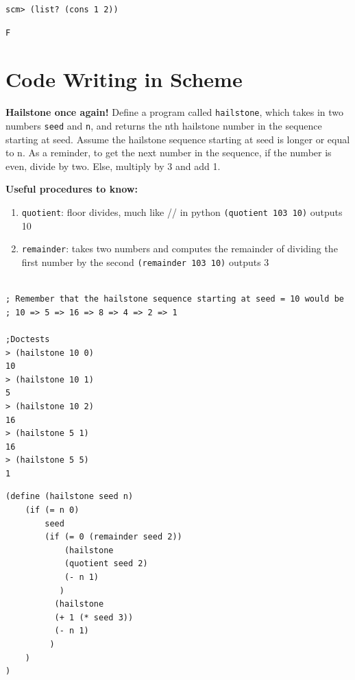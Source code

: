 \documentclass{exam}
\begin{document}
\begin{questions}
\begin{blocksection}
\begin{lstlisting}
scm> (list? (cons 1 2))
\end{lstlisting}
\begin{solution}[.25in]
\begin{lstlisting}
F
\end{lstlisting}
\end{solution}
\end{blocksection}

\section{Code Writing in Scheme}

\begin{blocksection}
\question \textbf{Hailstone once again!} Define a program called \texttt{hailstone}, which takes in two numbers \texttt{seed} and \texttt{n}, and returns the nth hailstone number in the sequence starting at seed. Assume the hailstone sequence starting at seed is longer or equal to n. As a reminder, to get the next number in the sequence, if the number is even, divide by two. Else, multiply by 3 and add 1. \newline

\textbf{Useful procedures to know:} \newline
\begin{enumerate}
\item \texttt{quotient}: floor divides, much like // in python 
\subitem \texttt{(quotient 103 10)} outputs 10 
\item \texttt{remainder}: takes two numbers and computes the remainder of dividing the first number by the second
\subitem \texttt{(remainder 103 10)} outputs 3
\end{enumerate}

\begin{lstlisting}

; Remember that the hailstone sequence starting at seed = 10 would be
; 10 => 5 => 16 => 8 => 4 => 2 => 1

;Doctests
> (hailstone 10 0)
10
> (hailstone 10 1)
5
> (hailstone 10 2)
16
> (hailstone 5 1)
16 
> (hailstone 5 5)
1
\end{lstlisting}

\begin{solution}[1in]
\begin{lstlisting}
(define (hailstone seed n)
    (if (= n 0)
        seed
        (if (= 0 (remainder seed 2))
            (hailstone 
            (quotient seed 2) 
            (- n 1)
           )
          (hailstone 
          (+ 1 (* seed 3)) 
          (- n 1)
         )
    )
)
\end{lstlisting}
\end{solution}
\end{blocksection}


\end{questions}
\end{document}
